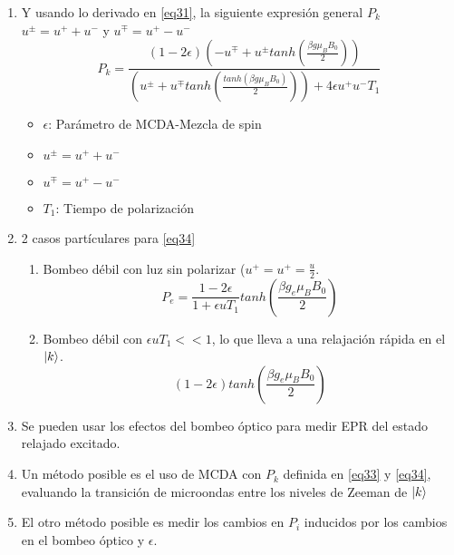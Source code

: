 \documentclass[aps,rmp,reprint,longbibliography]{revtex4-1}
\begin{document}
\begin{enumerate}
\item Y usando lo derivado en \ref{eq31}, la siguiente expresión general $P_k$ $u^\pm=u^++u^-$ y $u^\mp=u^+-u^-$
\begin{equation}\label{eq34}P_k=\frac{(1-2\epsilon)(-u^\mp+u^\pm tanh(\frac{\beta g \mu_BB_0}{2}))}{(u^\pm+u^\mp tanh(\frac{tanh(\beta g \mu_B B_0)}{2}))+4\epsilon u^+u^-T_1}\end{equation}
\begin{itemize}
    \item $\epsilon$: Parámetro de MCDA-Mezcla de spin
    \item $u^\pm=u^++u^-$
    \item $u^\mp=u^+-u^-$
    \item $T_1$: Tiempo de polarización 
\end{itemize}
\item 2 casos partículares para \ref{eq34}
\begin{enumerate}
    \item Bombeo débil con luz sin polarizar ($u^+=u^+=\frac{u}{2}$.
    \begin{equation}\label{eq35}P_e=\frac{1-2\epsilon}{1+\epsilon uT_1}tanh(\frac{\beta g_e\mu_BB_0}{2})\end{equation}
    \item Bombeo débil con $\epsilon u T_1<< 1$, lo que lleva a una relajación rápida en el $\ket{k}$.
    \begin{equation}\label{eq36}(1-2\epsilon)tanh(\frac{\beta g_e\mu_BB_0}{2})\end{equation}
\end{enumerate}
\item Se pueden usar los efectos del bombeo óptico para medir EPR del estado relajado excitado. 
\item Un método posible es el uso de MCDA con $P_k$ definida en \ref{eq33} y \ref{eq34}, evaluando la transición de microondas entre los niveles de Zeeman de $\ket{k}$
\item El otro método posible es medir los cambios en $P_i$ inducidos por los cambios en el bombeo óptico y $\epsilon$. 
\end{enumerate}
\end{document}
